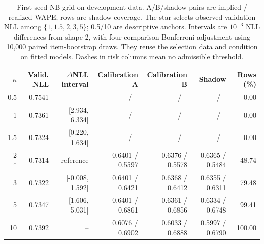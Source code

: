 \begin{table}[t]
\centering\small\setlength{\tabcolsep}{3pt}
\caption{First-seed NB grid on development data. A/B/shadow pairs are implied / realized WAPE; rows are shadow coverage. The star selects observed validation NLL among $\{1,1.5,2,3,5\}$; 0.5/10 are descriptive anchors. Intervals are $10^{-3}$ NLL differences from shape 2, with four-comparison Bonferroni adjustment using 10,000 paired item-bootstrap draws. They reuse the selection data and condition on fitted models. Dashes in risk columns mean no admissible threshold.}
\label{tab:nb-fine-grid}
\begin{tabular}{rrrrrrr}
\toprule
$\kappa$ & Valid. NLL & $\Delta$NLL interval & Calibration A & Calibration B & Shadow & Rows (\%)\\
\midrule
0.5 & 0.7541 & -- & -- / -- & -- / -- & -- / -- & 0.00 \\
1 & 0.7361 & [2.934, 6.334] & -- / -- & -- / -- & -- / -- & 0.00 \\
1.5 & 0.7324 & [0.220, 1.634] & -- / -- & -- / -- & -- / -- & 0.00 \\
2 * & 0.7314 & reference & 0.6401 / 0.5597 & 0.6376 / 0.5578 & 0.6365 / 0.5484 & 48.74 \\
3 & 0.7322 & [-0.008, 1.592] & 0.6401 / 0.6421 & 0.6368 / 0.6412 & 0.6355 / 0.6311 & 79.48 \\
5 & 0.7347 & [1.606, 5.031] & 0.6401 / 0.6861 & 0.6361 / 0.6856 & 0.6334 / 0.6748 & 99.41 \\
10 & 0.7392 & -- & 0.6076 / 0.6902 & 0.6033 / 0.6888 & 0.5997 / 0.6790 & 100.00 \\
\bottomrule
\end{tabular}
\end{table}
